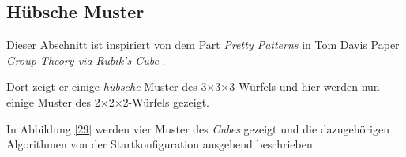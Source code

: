 \documentclass[12pt,a4paper, usenames, dvipsnames]{article}
\newcommand{\Ttwo}{2$\times$2$\times$2-}
\newcommand{\Tthree}{3$\times$3$\times$3-}
\begin{document}
%
%
%
%
%
%
%
%
%
%
%
%
%
%
%
%
%
%
%
\subsection*{Hübsche Muster}
Dieser Abschnitt ist inspiriert von dem Part \textit{Pretty Patterns} in Tom Davis Paper \textit{Group Theory via Rubik's Cube} \cite{TD}.

Dort zeigt er einige \textit{hübsche} Muster des \Tthree Würfels und hier werden nun einige Muster des \Ttwo Würfels gezeigt.

In Abbildung \ref{29} werden vier Muster des \textit{Cubes} gezeigt und die dazugehörigen Algorithmen von der Startkonfiguration ausgehend beschrieben.
\end{document}
